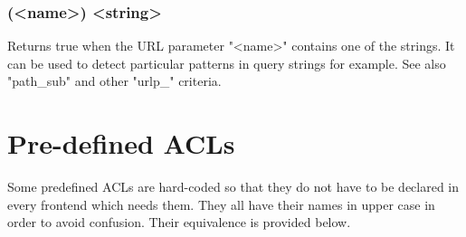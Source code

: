 \subsubsection[urlp\_sub]{(<name>) <string>}

  Returns true when the URL parameter "<name>" contains one of the strings. It
  can be used to detect particular patterns in query strings for example. See
  also "path\_sub" and other "urlp\_" criteria.

\section{Pre-defined ACLs}
\label{sec:pre_definded_acl}

Some predefined ACLs are hard-coded so that they do not have to be declared in
every frontend which needs them. They all have their names in upper case in
order to avoid confusion. Their equivalence is provided below.

